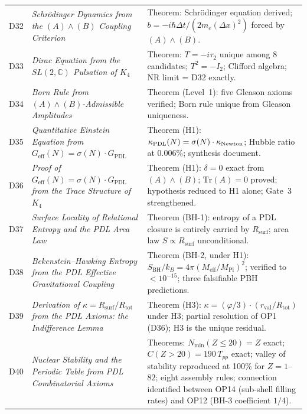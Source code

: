 \documentclass[11pt,a4paper]{article}
\theoremstyle{plain}
\theoremstyle{definition}
\theoremstyle{remark}
\newcommand{\PDL}{\textnormal{PDL}}
\newcommand{\Kfour}{K_4}
\newcommand{\Geff}{G_{\mathrm{eff}}}
\newcommand{\GPDL}{G_{\mathrm{PDL}}}
\newcommand{\rval}{r_{\mathrm{val}}}
\newcommand{\Rsurf}{R_{\mathrm{surf}}}
\newcommand{\Rtot}{R_{\mathrm{tot}}}
\newcommand{\sigmaN}{\sigma(N)}
\newcommand{\SBH}{S_{\mathrm{BH}}}
\newcommand{\Meff}{M_{\mathrm{eff}}}
\newcommand{\MPl}{M_{\mathrm{Pl}}}
\newcommand{\Tpp}{T_{pp}}
\newcommand{\Nmin}{N_{\min}}
\begin{document}
\begin{longtable}{@{}L{1.3cm}L{3.8cm}L{8.0cm}@{}}
D32 & \textit{Schr\"odinger Dynamics from the $(A)\wedge(B)$ Coupling Criterion}~\citep{D32} & \textcolor{proofblue}{Theorem}: Schr\"odinger equation derived; $b=-i\hbar\Delta t/(2m_e(\Delta x)^2)$ forced by $(A)\wedge(B)$. \\[0.3em]

D33 & \textit{Dirac Equation from the $SL(2,\mathbb{C})$ Pulsation of $\Kfour$}~\citep{D33} & \textcolor{proofblue}{Theorem}: $T=-i\tau_2$ unique among 8 candidates; $T^2=-I_2$; Clifford algebra; NR limit = D32 exactly. \\[0.3em]

D34 & \textit{Born Rule from $(A)\wedge(B)$-Admissible Amplitudes}~\citep{D34} & \textcolor{proofblue}{Theorem (Level~1)}: five Gleason axioms verified; Born rule unique from Gleason uniqueness. \\[0.3em]

D35 & \textit{Quantitative Einstein Equation from $\Geff(N)=\sigmaN\cdot\GPDL$}~\citep{D35} & \textcolor{proofblue}{Theorem (H1)}: $\kappa_{\PDL}(N)=\sigmaN\cdot\kappa_{\mathrm{Newton}}$; Hubble ratio at 0.006\%; synthesis document. \\[0.3em]

D36 & \textit{Proof of $\Geff(N)=\sigmaN\cdot\GPDL$ from the Trace Structure of $\Kfour$}~\citep{D36} & \textcolor{proofblue}{Theorem (H1)}: $\delta=0$ exact from $(A)\wedge(B)$; $\mathrm{Tr}(A)=0$ proved; hypothesis reduced to H1 alone; Gate~3 strengthened. \\[0.4em]

D37 & \textit{Surface Locality of Relational Entropy and the PDL Area Law}~\citep{D37} & \textcolor{proofblue}{Theorem (BH-1)}: entropy of a PDL closure is entirely carried by $\Rsurf$; area law $S\propto\Rsurf$ unconditional. \\[0.3em]

D38 & \textit{Bekenstein--Hawking Entropy from the PDL Effective Gravitational Coupling}~\citep{D38} & \textcolor{proofblue}{Theorem (BH-2, under H1)}: $\SBH/k_B=4\pi(\Meff/\MPl)^2$; verified to $<10^{-15}$; three falsifiable PBH predictions. \\[0.3em]

D39 & \textit{Derivation of $\kappa=\Rsurf/\Rtot$ from the PDL Axioms: the Indifference Lemma}~\citep{D39} & \textcolor{proofblue}{Theorem (H3)}: $\kappa=(\varphi/3)\cdot(\rval/\Rtot)$ under H3; partial resolution of OP1 (D36); H3 is the unique residual. \\[0.4em]

D40 & \textit{Nuclear Stability and the Periodic Table from PDL Combinatorial Axioms}~\citep{D40} & \textcolor{proofblue}{Theorems}: $\Nmin(Z\leq20)=Z$ exact; $C(Z>20)=190\,\Tpp$ exact; valley of stability reproduced at 100\% for $Z=1$--$82$; eight assembly rules; connection identified between OP14 (sub-shell filling rates) and OP12 (BH-3 coefficient $1/4$). \\[0.4em]

\end{longtable}
\end{document}
